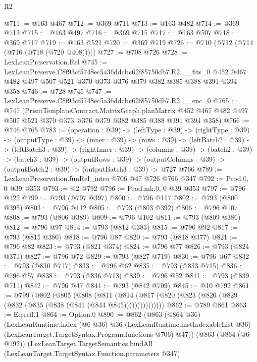 \begin{lexlean}{R2}
\begin{coremodule}
@711 := @163 @467
@712 := @369 @711
@713 := @163 @482
@714 := @369 @713
@715 := @163 @497
@716 := @369 @715
@717 := @163 @507
@718 := @369 @717
@719 := @163 @521
@720 := @369 @719
@726 := @710 (@712 (@714 (@716 (@718 (@720 @408)))))
@727 := @708 @726
@728 := LexLeanPreservation.Rel
@745 := LexLeanPreserve.C8f93cf5748ec5a36ddcbc62f85750db7.R2.__fits_0
    @452
    @467
    @482
    @497
    @507
    @521
    @370
    @373
    @376
    @379
    @382
    @385
    @388
    @391
    @394
    @358
@746 := @728 @745
@747 := LexLeanPreserve.C8f93cf5748ec5a36ddcbc62f85750db7.R2.__enc_0
@765 := @747
    (PrismTemplateContract.MatrixGraph.planMatrix
      @452
      @467
      @482
      @497
      @507
      @521
      @370
      @373
      @376
      @379
      @382
      @385
      @388
      @391
      @394
      @358)
@766 := @746 @765
@783 := (operation : @39) ->
  (leftType : @39) ->
  (rightType : @39) ->
  (outputType : @39) ->
  (inner : @39) ->
  (rows : @39) ->
  (leftBatch2 : @39) ->
  (leftBatch3 : @39) ->
  (rightInner : @39) ->
  (columns : @39) ->
  (batch2 : @39) ->
  (batch3 : @39) ->
  (outputRows : @39) ->
  (outputColumns : @39) -> (outputBatch2 : @39) -> (outputBatch3 : @39) -> @727 @766
@789 := LexLeanPreservation.funRel_intro @706 @47 @726 @766 @347
@792 := Prod.{0, 0} @39 @353
@793 := @2 @792
@796 := Prod.mk.{0, 0} @39 @353
@797 := @796 @122
@799 := @793 (@797 @397)
@800 := @796 @117
@802 := @793 (@800 @395)
@803 := @796 @112
@805 := @793 (@803 @392)
@806 := @796 @107
@808 := @793 (@806 @389)
@809 := @796 @102
@811 := @793 (@809 @386)
@812 := @796 @97
@814 := @793 (@812 @383)
@815 := @796 @92
@817 := @793 (@815 @380)
@818 := @796 @87
@820 := @793 (@818 @377)
@821 := @796 @82
@823 := @793 (@821 @374)
@824 := @796 @77
@826 := @793 (@824 @371)
@827 := @796 @72
@829 := @793 (@827 @719)
@830 := @796 @67
@832 := @793 (@830 @717)
@833 := @796 @62
@835 := @793 (@833 @715)
@836 := @796 @57
@838 := @793 (@836 @713)
@839 := @796 @52
@841 := @793 (@839 @711)
@842 := @796 @47
@844 := @793 (@842 @709)
@845 := @10 @792
@861 := @799
    (@802
      (@805
        (@808
          (@811
            (@814 (@817 (@820 (@823 (@826 (@829 (@832 (@835 (@838 (@841 (@844 @845)))))))))))))))
@862 := @789 @861
@863 := Eq.refl.{1}
@864 := Option.{0}
@890 := @862
    (@863
      (@864 @36)
      (LexLeanRuntime.index
        (@6 @36)
        @36
        (LexLeanRuntime.instIndexableList @36)
        (LexLeanTarget.TargetSyntax.Program.functions @706)
        @47))
    (@863
      (@864 (@6 @792))
      (LexLeanTarget.TargetSemantics.bindAll
        (LexLeanTarget.TargetSyntax.Function.parameters @347)

\end{coremodule}
\end{lexlean}
